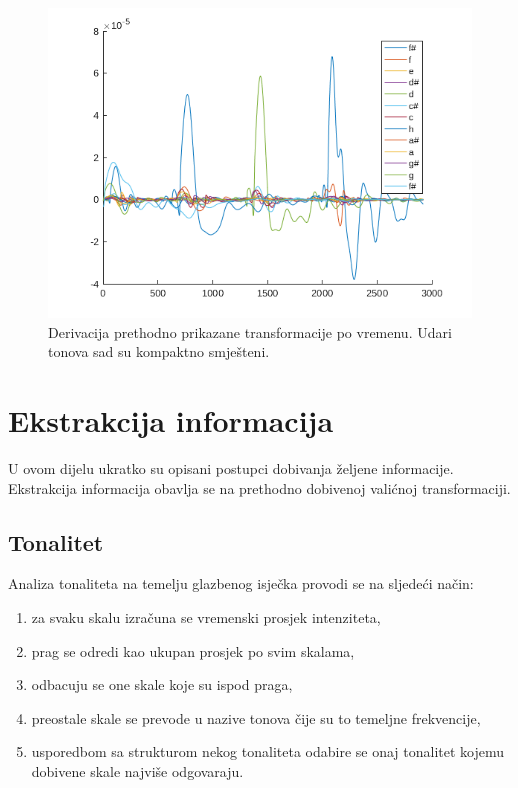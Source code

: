 \documentclass[a4paper, 10pt, twocolumn]{article}
\begin{document}
\begin{figure}[htb]
  \includegraphics[width=\linewidth]{adsr_der}
  \caption{Derivacija prethodno prikazane transformacije po vremenu. Udari tonova sad su kompaktno smješteni.}
  \label{fig:adsr_der}
\end{figure}


\section{Ekstrakcija informacija}
U ovom dijelu ukratko su opisani postupci dobivanja željene informacije.
Ekstrakcija informacija obavlja se na prethodno dobivenoj valićnoj transformaciji.

\subsection{Tonalitet}
Analiza tonaliteta na temelju glazbenog isječka provodi se na sljedeći način:
\begin{enumerate}
  \item za svaku skalu izračuna se vremenski prosjek intenziteta,
  \item prag se odredi kao ukupan prosjek po svim skalama,
  \item odbacuju se one skale koje su ispod praga,
  \item preostale skale se prevode u nazive tonova čije su to temeljne frekvencije,
  \item usporedbom sa strukturom nekog tonaliteta odabire se onaj tonalitet kojemu dobivene skale najviše odgovaraju.
\end{enumerate}
\end{document}
